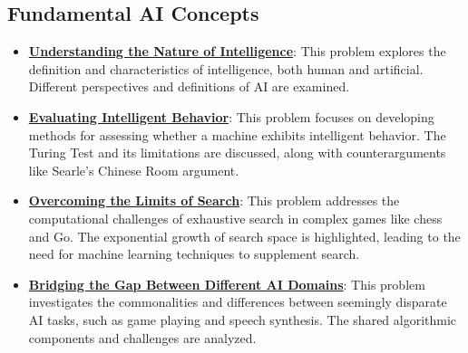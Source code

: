 \documentclass{article}%
\begin{document}
\subsection{Fundamental AI Concepts}%
\label{subsec:FundamentalAIConcepts}%
\begin{itemize}[leftmargin=*]%
\item \href{https://purdue.brightspace.com/d2l/common/assets/pdfjs-d2l-dist/1.0.14-legacy/web/viewer.html?file=\%2Fcontent\%2Fenforced\%2F1095467-wl.202510.CS.24300.001\%2F02L2-Intro.pdf\%3Fou\%3D1095467\&lang=en-us\&container=d2l-fileviewer-rendered-pdf\&fullscreen=d2l-fileviewer-rendered-pdf-dialog\&height=667#page=5}{\textbf{Understanding the Nature of Intelligence}}: This problem explores the definition and characteristics of intelligence, both human and artificial. Different perspectives and definitions of AI are examined.%
\item \href{https://purdue.brightspace.com/d2l/common/assets/pdfjs-d2l-dist/1.0.14-legacy/web/viewer.html?file=\%2Fcontent\%2Fenforced\%2F1095467-wl.202510.CS.24300.001\%2F02L2-Intro.pdf\%3Fou\%3D1095467\&lang=en-us\&container=d2l-fileviewer-rendered-pdf\&fullscreen=d2l-fileviewer-rendered-pdf-dialog\&height=667#page=6}{\textbf{Evaluating Intelligent Behavior}}: This problem focuses on developing methods for assessing whether a machine exhibits intelligent behavior. The Turing Test and its limitations are discussed, along with counterarguments like Searle's Chinese Room argument.%
\item \href{https://purdue.brightspace.com/d2l/common/assets/pdfjs-d2l-dist/1.0.14-legacy/web/viewer.html?file=\%2Fcontent\%2Fenforced\%2F1095467-wl.202510.CS.24300.001\%2F02L2-Intro.pdf\%3Fou\%3D1095467\&lang=en-us\&container=d2l-fileviewer-rendered-pdf\&fullscreen=d2l-fileviewer-rendered-pdf-dialog\&height=667#page=11}{\textbf{Overcoming the Limits of Search}}: This problem addresses the computational challenges of exhaustive search in complex games like chess and Go. The exponential growth of search space is highlighted, leading to the need for machine learning techniques to supplement search.%
\item \href{https://purdue.brightspace.com/d2l/common/assets/pdfjs-d2l-dist/1.0.14-legacy/web/viewer.html?file=\%2Fcontent\%2Fenforced\%2F1095467-wl.202510.CS.24300.001\%2F02L2-Intro.pdf\%3Fou\%3D1095467\&lang=en-us\&container=d2l-fileviewer-rendered-pdf\&fullscreen=d2l-fileviewer-rendered-pdf-dialog\&height=667#page=31}{\textbf{Bridging the Gap Between Different AI Domains}}: This problem investigates the commonalities and differences between seemingly disparate AI tasks, such as game playing and speech synthesis. The shared algorithmic components and challenges are analyzed.%

\end{itemize}
\end{document}
